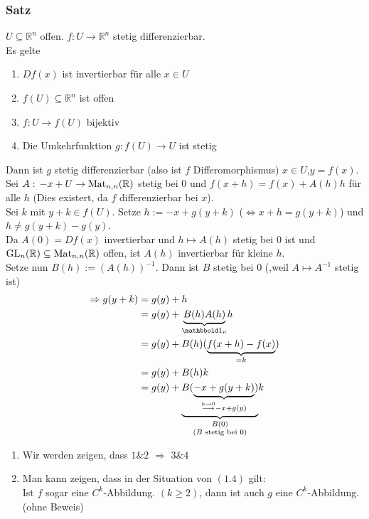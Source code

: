 \subsubsection{Satz} %
\label{satz14}
$ U \subseteq \mathbb{R}^n$ offen. $ f: U \to \mathbb{R}^n $ stetig differenzierbar. \\
Es gelte
\begin{enumerate}
	\item $Df(x)$ ist invertierbar für alle $x \in U$
	\item $f(U) \subseteq \mathbb{R}^n$ ist offen
	\item $f:U \to f(U)$ bijektiv
	\item Die Umkehrfunktion $g:f(U) \to U$ ist stetig
\end{enumerate}
Dann ist $g$ stetig differenzierbar (also ist $f$  Differomorphismus)
 $x \in U$,$y=f(x)$. Sei $A: \,-x+U \to \operatorname{Mat}_{n,n}(\mathbb{R})$ stetig bei $0$ und $f(x+h)=f(x)+A(h)h$ für alle $h$ (Dies existert, da $f$ differenzierbar bei $x$). \\
Sei $k$ mit $y+k \in f(U)$. Setze $h:= -x+g(y+k)$ ($\Leftrightarrow x+h=g(y+k)$) und $h \neq g(y+k)-g(y)$. \\
Da $A(0)=Df(x)$ invertierbar und $h \mapsto A(h)$ stetig bei $0$ ist und $\operatorname{GL}_n(\mathbb{R}) \subseteq \operatorname{Mat}_{n,n}(\mathbb{R})$ offen, ist $A(h)$ invertierbar für kleine $h$. \\
Setze nun $B(h):=(A(h))^{-1}$. Dann ist $B$ stetig bei $0$ (,weil $A \mapsto A^{-1}$ stetig ist)
\begin{align*}
	\Rightarrow g(y+k)&= g(y)+h \\
	&= g(y)+ \underset{\ind_n}{\underbrace{B(h)A(h)}}h \\
	&= g(y) + B(h)(\underset{=k}{\underbrace{f(x+h)-f(x)}}) \\
	&= g(y) + B(h)k \\
	&= g(y) + \underset{\substack{B(0) \\ \text{($B$ stetig bei $0$)}}}{\underbrace{B(\underset{\stackrel{k \to 0}{\longrightarrow}-x+g(y)}{\underbrace{-x+g(y+k)}})}}k
\end{align*} 
\bewende
{}
\begin{enumerate}
	\item Wir werden zeigen, dass $1 \& 2$ $\Rightarrow$ $3 \& 4$
	\item Man kann zeigen, dass in der Situation von $(1.4)$ gilt: \\
	Ist $f$ sogar eine $C^k$-Abbildung. $(k \geq 2)$, dann ist auch $g$ eine $C^k$-Abbildung. (ohne Beweis)
\end{enumerate}

